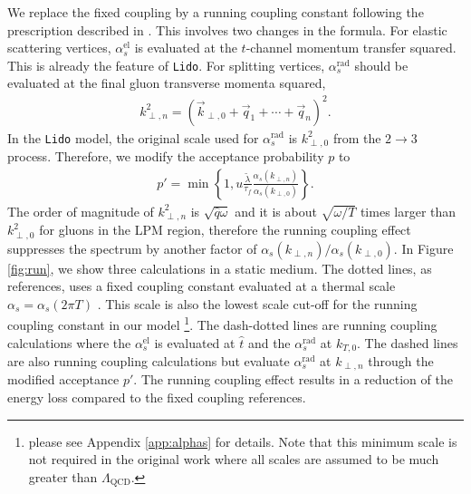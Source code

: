 \documentclass[aps, prc, reprint, amsmath, groupedaddress, nofootinbib]{revtex4-1}
\begin{document}
We replace the fixed coupling by a running coupling constant  following the prescription described in \cite{Arnold:2008zu}.
This involves two changes in the formula. 
For elastic scattering vertices, $\alpha_s^{\textrm{el}}$ is evaluated at the $t$-channel momentum transfer squared. 
This is already the feature of {\tt Lido}.
For splitting vertices,  $\alpha_s^{\textrm{rad}}$ should be evaluated at the final gluon transverse momenta squared,
\begin{eqnarray}\label{eq:kTn}
k_{\perp,n}^2 = \left(\vec{k}_{\perp,0}+\vec{q}_1+\cdots+\vec{q}_n\right)^2.
\end{eqnarray} 
In the {\tt Lido} model, the original scale used for $\alpha_s^{\textrm{rad}}$ is $k_{\perp,0}^2$ from the $2\rightarrow 3$ process.
Therefore, we modify the acceptance probability $p$ to
\begin{eqnarray}
p' = \min\left\{1, u\frac{\tilde{\lambda}}{\tau_f}\frac{\alpha_s(k_{\perp,n})}{\alpha_s(k_{\perp,0})}\right\}.
\end{eqnarray}
The order of magnitude of $k_{\perp,n}^2$ is $\sqrt{\hat{q}\omega}$ and it is about $\sqrt{\omega/T}$ times larger than $k_{\perp,0}^2$ for gluons in the LPM region, therefore the running coupling effect suppresses the spectrum by another factor of $\alpha_s(k_{\perp,n})/\alpha_s(k_{\perp,0})$.
In Figure \ref{fig:run}, we show three calculations in a static medium. The dotted lines, as references, uses a fixed coupling constant evaluated at a thermal scale $\alpha_s = \alpha_s(2\pi T)$ .
This scale is also the lowest scale cut-off for the running coupling constant in our model \footnote{please see Appendix \ref{app:alphas} for details. Note that this minimum scale is not required in the original work \cite{Arnold:2008zu} where all scales are assumed to be much greater than $\Lambda_{\textrm{QCD}}$.}.
The dash-dotted lines are running coupling calculations where the $\alpha_s^{\textrm{el}}$ is evaluated at $\hat{t}$ and the $\alpha_s^{\textrm{rad}}$ at $k_{T,0}$.
The dashed lines are also running coupling calculations but evaluate $\alpha_s^{\textrm{rad}}$ at $k_{\perp,n}$ through the modified acceptance $p'$.
The running coupling effect results in a reduction of the energy loss compared to the fixed coupling references.
\end{document}
